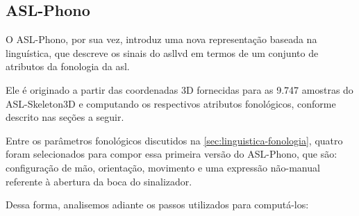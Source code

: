\subsection{ASL-Phono}
\label{sec:metodologia-datasets-phono}

O ASL-Phono, por sua vez, introduz uma nova representação baseada na linguística, que descreve os sinais do \acrshort{asllvd} em termos de um conjunto de atributos da fonologia da \acrshort{asl}.

Ele é originado a partir das coordenadas 3D fornecidas para as 9.747 amostras do ASL-Skeleton3D e computando os respectivos atributos fonológicos, conforme descrito nas seções a seguir.

Entre os parâmetros fonológicos discutidos na \autoref{sec:linguistica-fonologia}, quatro foram selecionados para compor essa primeira versão do ASL-Phono, que são: configuração de mão, orientação, movimento e uma expressão não-manual referente à abertura da boca do sinalizador.

Dessa forma, analisemos adiante os passos utilizados para computá-los:

